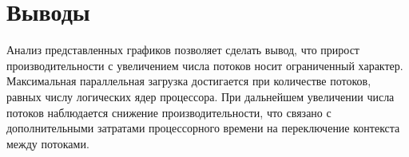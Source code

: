 \section*{Выводы}
Анализ представленных графиков позволяет сделать вывод, что прирост производительности с увеличением числа потоков носит ограниченный характер. Максимальная параллельная загрузка достигается при количестве потоков, равных числу логических ядер процессора. При дальнейшем увеличении числа потоков наблюдается снижение производительности, что связано с дополнительными затратами процессорного времени на переключение контекста между потоками.



